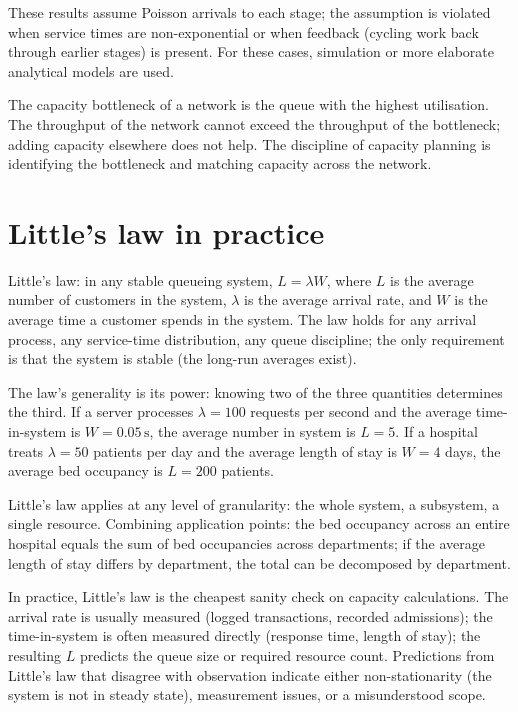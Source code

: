 These results assume Poisson arrivals to each stage; the assumption is violated when service times are non-exponential or when feedback (cycling work back through earlier stages) is present. For these cases, simulation or more elaborate analytical models are used.

The capacity bottleneck of a network is the queue with the highest utilisation. The throughput of the network cannot exceed the throughput of the bottleneck; adding capacity elsewhere does not help. The discipline of capacity planning is identifying the bottleneck and matching capacity across the network.

\section{Little's law in practice}

Little's law: in any stable queueing system, $L = \lambda W$, where $L$ is the average number of customers in the system, $\lambda$ is the average arrival rate, and $W$ is the average time a customer spends in the system. The law holds for any arrival process, any service-time distribution, any queue discipline; the only requirement is that the system is stable (the long-run averages exist).

The law's generality is its power: knowing two of the three quantities determines the third. If a server processes $\lambda = 100$ requests per second and the average time-in-system is $W = 0.05\,\text{s}$, the average number in system is $L = 5$. If a hospital treats $\lambda = 50$ patients per day and the average length of stay is $W = 4$ days, the average bed occupancy is $L = 200$ patients.

Little's law applies at any level of granularity: the whole system, a subsystem, a single resource. Combining application points: the bed occupancy across an entire hospital equals the sum of bed occupancies across departments; if the average length of stay differs by department, the total can be decomposed by department.

In practice, Little's law is the cheapest sanity check on capacity calculations. The arrival rate is usually measured (logged transactions, recorded admissions); the time-in-system is often measured directly (response time, length of stay); the resulting $L$ predicts the queue size or required resource count. Predictions from Little's law that disagree with observation indicate either non-stationarity (the system is not in steady state), measurement issues, or a misunderstood scope.

